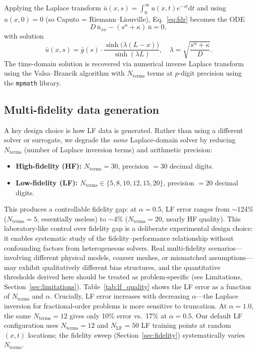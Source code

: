 \documentclass[preprint,12pt]{elsarticle}
\newcommand{\diff}{\mathrm{d}}
\newcommand{\NLF}{N_{\mathrm{LF}}}
\begin{document}
Applying the Laplace transform $\bar{u}(x,s) = \int_0^\infty u(x,t) e^{-st}\diff t$ and using $u(x,0) = 0$ (so Caputo = Riemann--Liouville), Eq.~\eqref{eq:fdr} becomes the ODE
\begin{equation}
D\, \bar{u}_{xx} - (s^\alpha + \kappa)\, \bar{u} = 0,
\end{equation}
with solution
\begin{equation}
\label{eq:laplace_solution}
\bar{u}(x, s) = \bar{g}(s) \cdot \frac{\sinh\bigl(\lambda(L-x)\bigr)}{\sinh(\lambda L)}, \quad \lambda = \sqrt{\frac{s^\alpha + \kappa}{D}}.
\end{equation}
The time-domain solution is recovered via numerical inverse Laplace transform using the Valsa--Brancik algorithm \cite{valsa2001approximate} with $N_{\mathrm{terms}}$ terms at $p$-digit precision using the \texttt{mpmath} library.

\subsection{Multi-fidelity data generation}
\label{sec:mf_data}

A key design choice is how LF data is generated. Rather than using a different solver or surrogate, we degrade the \emph{same} Laplace-domain solver by reducing $N_{\mathrm{terms}}$ (number of Laplace inversion terms) and arithmetic precision:
\begin{itemize}
    \item \textbf{High-fidelity (HF):} $N_{\mathrm{terms}} = 30$, precision $= 30$ decimal digits.
    \item \textbf{Low-fidelity (LF):} $N_{\mathrm{terms}} \in \{5, 8, 10, 12, 15, 20\}$, precision $= 20$ decimal digits.
\end{itemize}
This produces a controllable fidelity gap: at $\alpha = 0.5$, LF error ranges from $\sim$124\% ($N_{\mathrm{terms}} = 5$, essentially useless) to $\sim$4\% ($N_{\mathrm{terms}} = 20$, nearly HF quality). This laboratory-like control over fidelity gap is a deliberate experimental design choice: it enables systematic study of the fidelity--performance relationship without confounding factors from heterogeneous solvers. Real multi-fidelity scenarios---involving different physical models, coarser meshes, or mismatched assumptions---may exhibit qualitatively different bias structures, and the quantitative thresholds derived here should be treated as problem-specific (see Limitations, Section~\ref{sec:limitations}). Table~\ref{tab:lf_quality} shows the LF error as a function of $N_{\mathrm{terms}}$ and $\alpha$. Crucially, LF error increases with decreasing $\alpha$---the Laplace inversion for fractional-order problems is more sensitive to truncation. At $\alpha = 1.0$, the same $N_{\mathrm{terms}} = 12$ gives only 10\% error vs.\ 17\% at $\alpha = 0.5$. Our default LF configuration uses $N_{\mathrm{terms}} = 12$ and $\NLF = 50$ LF training points at random $(x, t)$ locations; the fidelity sweep (Section~\ref{sec:fidelity}) systematically varies $N_{\mathrm{terms}}$.
\end{document}

